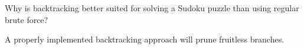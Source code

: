 Why is backtracking better suited for solving a Sudoku puzzle than using regular brute force?
	
	\begin{answer}
	A properly implemented backtracking approach will prune fruitless branches. 
	\end{answer}